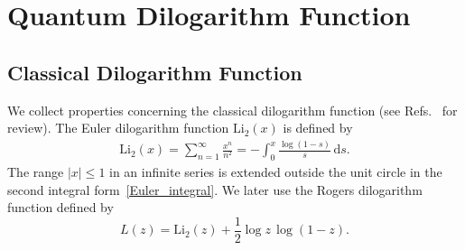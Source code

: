 \documentclass[12pt]{article}
\numberwithin{equation}{section}
\newcommand{\Li}{\mathrm{Li}_2}
\begin{document}






\section{Quantum Dilogarithm Function}
\label{sec:dilog}


\subsection{Classical Dilogarithm Function}

We collect properties concerning the classical dilogarithm function
(see Refs.~ for review).
The Euler dilogarithm function $\Li(x)$ is defined by
\begin{align}
  \Li(x)
  =
  \sum_{n=1}^\infty \frac{x^n}{n^2}
  = - \int_0^x
  \frac{\log(1-s)}{s} \, \mathrm{d} s  .
  \label{Euler_integral}
\end{align}
The range $|x| \leq 1$ in an infinite series is extended outside the
unit circle in the second
integral form~\eqref{Euler_integral}.
We later use the Rogers dilogarithm function  defined by
\begin{equation}
  \label{Rogers}
  L(z)
  =
  \Li(z) + \frac{1}{2} \log z \, \log(1-z) .
\end{equation}
\end{document}
